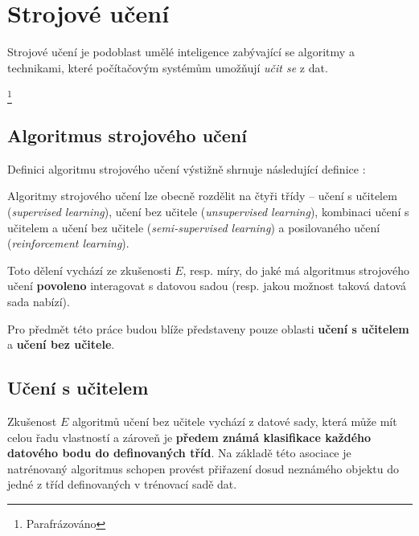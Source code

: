 \section{Strojové učení}
Strojové učení je podoblast umělé inteligence zabývající se algoritmy a technikami, které počítačovým systémům umožňují \emph{učit se} z dat.
\begin{displayquote}
     \cite{Samuel1967}\footnote{Parafrázováno}
\end{displayquote}
\subsection{Algoritmus strojového učení}
\label{sec:machine_learning_algorithm}
Definici algoritmu strojového učení výstižně shrnuje následující definice \cite[str. 2]{Mitchell1997}:
\begin{displayquote}
\end{displayquote}
Algoritmy strojového učení lze obecně rozdělit na čtyři třídy – učení s učitelem (\emph{supervised learning}),
učení bez učitele (\emph{unsupervised learning}), kombinaci učení s učitelem a učení bez učitele (\emph{semi-supervised learning}) a posilovaného učení (\emph{reinforcement learning}).

Toto dělení vychází ze zkušenosti $E$, resp. míry, do jaké má algoritmus strojového učení \textbf{povoleno} interagovat s datovou sadou (resp. jakou možnost taková datová sada nabízí). \cite{Goodfellow2016}

Pro předmět této práce budou blíže představeny pouze oblasti \textbf{učení s učitelem} a \textbf{učení bez učitele}.
\subsection{Učení s učitelem}
\label{sec:supervised_learning}
Zkušenost $E$ algoritmů učení bez učitele vychází z datové sady, která může mít celou řadu vlastností a zároveň je \textbf{předem známá klasifikace každého datového bodu do definovaných tříd}.
Na základě této asociace je natrénovaný algoritmus schopen provést přiřazení dosud neznámého objektu do jedné z tříd definovaných v trénovací sadě dat.

